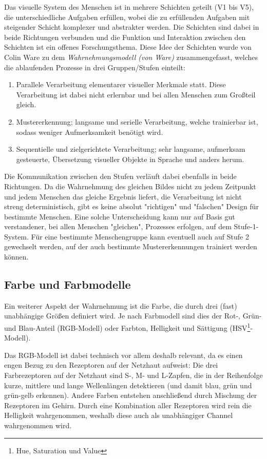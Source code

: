 			Das visuelle System des Menschen ist in mehrere Schichten geteilt (V1 bis V5), die unterschiedliche Aufgaben erfüllen, wobei die zu erfüllenden Aufgaben mit steigender Schicht komplexer und abstrakter werden. Die Schichten sind dabei in beide Richtungen verbunden und die Funktion und Interaktion zwischen den Schichten ist ein offenes Forschungsthema. Diese Idee der Schichten wurde von Colin Ware zu dem \emph{Wahrnehmungsmodell (von Ware)} zusammengefasst, welches die ablaufenden Prozesse in drei Gruppen/Stufen einteilt:
			\begin{enumerate}
				\item Parallele Verarbeitung elementarer visueller Merkmale statt. Diese Verarbeitung ist dabei nicht erlernbar und bei allen Menschen zum Großteil gleich.
				\item Mustererkennung; langsame und serielle Verarbeitung, welche trainierbar ist, sodass weniger Aufmerksamkeit benötigt wird.
				\item Sequentielle und zielgerichtete Verarbeitung; sehr langsame, aufmerksam gesteuerte, Übersetzung visueller Objekte in Sprache und anders herum.
			\end{enumerate}
			Die Kommunikation zwischen den Stufen verläuft dabei ebenfalls in beide Richtungen. Da die Wahrnehmung des gleichen Bildes nicht zu jedem Zeitpunkt und jedem Menschen das gleiche Ergebnis liefert, \dh die Verarbeitung ist nicht streng deterministisch, gibt es keine absolut "richtigen" und "falschen" Design für bestimmte Menschen. Eine solche Unterscheidung kann nur auf Basis gut verstandener, bei allen Menschen "gleichen", Prozesses erfolgen, \dh auf dem Stufe-1-System. Für eine bestimmte Menschengruppe kann eventuell auch auf Stufe 2 gewechselt werden, auf der auch bestimmte Mustererkennungen trainiert werden können.

		\subsection{Farbe und Farbmodelle}
			\label{subsec:farbe}

			Ein weiterer Aspekt der Wahrnehmung ist die Farbe, die durch drei (fast) unabhängige Größen definiert wird. Je nach Farbmodell sind dies \bspw der Rot-, Grün- und Blau-Anteil (RGB-Modell) oder Farbton, Helligkeit und Sättigung (HSV\footnote{Hue, Saturation und Value}-Modell).

			Das RGB-Modell ist dabei technisch vor allem deshalb relevant, da es einen engen Bezug zu den Rezeptoren auf der Netzhaut aufweist: Die drei Farbrezeptoren auf der Netzhaut sind S-, M- und L-Zapfen, die in der Reihenfolge kurze, mittlere und lange Wellenlängen detektieren (und damit blau, grün und grün-gelb erkennen). Andere Farben entstehen anschließend durch Mischung der Rezeptoren im Gehirn. Durch eine Kombination aller Rezeptoren wird rein die Helligkeit wahrgenommen, weshalb diese auch als unabhängiger Channel wahrgenommen wird.

